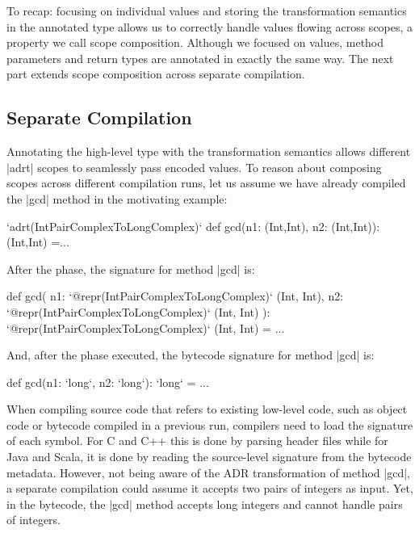 To recap: focusing on individual values and storing the transformation semantics in the annotated type allows us to correctly handle values flowing across scopes, a property we call scope composition. Although we focused on values, method parameters and return types are annotated in exactly the same way. The next part extends scope composition across separate compilation.


\subsection{Separate Compilation}
\label{sec:ildl:separate-compilation}


Annotating the high-level type with the transformation semantics allows different |adrt| scopes to seamlessly pass encoded values. To reason about composing scopes across different compilation runs, let us assume we have already compiled the |gcd| method in the motivating example:

\begin{lstlisting-nobreak}
`adrt(IntPairComplexToLongComplex)` {
  def gcd(n1: (Int,Int), n2: (Int,Int)): (Int,Int) =...
}
\end{lstlisting-nobreak}

After the \inject{} phase, the signature for method |gcd| is:

\begin{lstlisting-nobreak}
def gcd(
    n1: `@repr(IntPairComplexToLongComplex)` (Int, Int),
    n2: `@repr(IntPairComplexToLongComplex)` (Int, Int)
  ): `@repr(IntPairComplexToLongComplex)` (Int, Int) = ...
\end{lstlisting-nobreak}

And, after the \commit{} phase executed, the bytecode signature for method |gcd| is:

\begin{lstlisting-nobreak}
def gcd(n1: `long`, n2: `long`): `long` = ...
\end{lstlisting-nobreak}

When compiling source code that refers to existing low-level code, such as object code or bytecode compiled in a previous run, compilers need to load the signature of each symbol. For C and C++ this is done by parsing header files while for Java and Scala, it is done by reading the source-level signature from the bytecode metadata. However, not being aware of the ADR transformation of method |gcd|, a separate compilation could assume it accepts two pairs of integers as input. Yet, in the bytecode, the |gcd| method accepts long integers and cannot handle pairs of integers.

